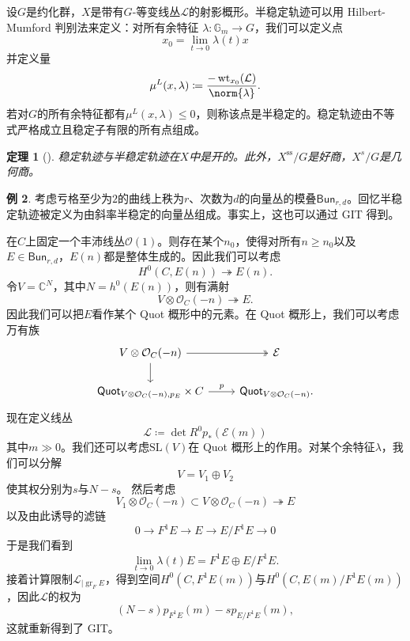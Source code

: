 \documentclass{amsart}
\newtheorem{thm}{定理}[section]
\theoremstyle{definition}
\newtheorem{exm}[thm]{例}
\theoremstyle{remark}
\theoremstyle{plain}
\theoremstyle{definition}
\theoremstyle{remark}
\newcommand{\G}{\mathbb{G}}
\newcommand{\C}{\mathbb{C}}
\newcommand{\mc}[1]{\mathcal{#1}}
\newcommand{\mr}[1]{\mathrm{#1}}
\newcommand{\on}[1]{\operatorname{#1}}
\newcommand{\ms}[1]{\mathsf{#1}}
\newcommand{\1}{\mathbf{1}}
\newcommand{\2}{\mathbf{2}}
\newcommand{\3}{\mathbf{3}}
\begin{document}
设\(G\)是约化群，\(X\)是带有\(G\)-等变线丛\(\mc{L}\)的射影概形。半稳定轨迹可以用 Hilbert-Mumford 判别法来定义：对所有余特征
\(\lambda \colon \G_m \to G\)，我们可以定义点
\[ x_0 = \lim_{t \to 0} \lambda(t) x \]
并定义量
\[ \mu^L(x, \lambda) \coloneqq \frac{-\on{wt}_{x_0}(\mc{L})}{\norm{\lambda}}. \]
若对\(G\)的所有余特征都有\(\mu^L(x, \lambda) \leq 0\)，则称该点是半稳定的。稳定轨迹由不等式严格成立且稳定子有限的所有点组成。

\begin{thm}[{\cite{MFK1994}}]
    稳定轨迹与半稳定轨迹在\(X\)中是开的。此外，\(X^{\on{ss}}/G\)是好商，\(X^s/G\)是几何商。
\end{thm}

\begin{exm}
    考虑亏格至少为\(2\)的曲线上秩为\(r\)、次数为\(d\)的向量丛的模叠\(\ms{Bun}_{r,d}\)。回忆半稳定轨迹被定义为由斜率半稳定的向量丛组成。事实上，这也可以通过 GIT 得到。

    在\(C\)上固定一个丰沛线丛\(\mc{O}(1)\)。则存在某个\(n_0\)，使得对所有\(n \geq n_0\)以及\(E \in \ms{Bun}_{r,d}\)，\(E(n)\)都是整体生成的。因此我们可以考虑
    \[ H^0(C, E(n)) \twoheadrightarrow E(n). \]
    令\(V = \C^N\)，其中\(N = h^0(E(n))\)，则有满射
    \[ V \otimes \mc{O}_C(-n) \twoheadrightarrow E. \]
    因此我们可以把\(E\)看作某个 Quot 概形中的元素。在 Quot 概形上，我们可以考虑万有族
    \begin{equation*}
    \begin{tikzcd}
        V \otimes \mc{O}_C(-n) \ar[twoheadrightarrow]{r} \ar{d} & \mc{E} \\
        \ms{Quot}_{V \otimes \mc{O}_C(-n), p_E} \times C \ar{r}{p} & \ms{Quot}_{V \otimes \mc{O}_C(-n)}.
    \end{tikzcd}
    \end{equation*}
    现在定义线丛
    \[ \mc{L} \coloneqq \det R^0 p_* (\mc{E}(m)) \]
    其中\(m \gg 0\)。我们还可以考虑\(\mr{SL}(V)\)在 Quot 概形上的作用。对某个余特征\(\lambda\)，我们可以分解
    \[ V = V_1 \oplus V_2 \]
    使其权分别为\(s\)与\(N-s\)。
    然后考虑
    \[ V_1 \otimes \mc{O}_C(-n) \subset V \otimes \mc{O}_C(-n) \twoheadrightarrow E \]
    以及由此诱导的滤链
    \[ 0 \to F^1 E \to E \to E / F^1 E \to 0 \]
    于是我们看到
    \[ \lim_{t \to 0} \lambda(t) E = F^1 E \oplus E/F^1 E. \]
    接着计算限制\(\mc{L}_{|\on{gr}_F E}\)，得到空间\(H^0(C, F^1 E(m))\)与\(H^0(C, E(m)/F^1 E(m))\)，因此\(\mc{L}\)的权为
    \[ (N-s) p_{F^1 E}(m) - s p_{E/F^1 E}(m), \]
    这就重新得到了 GIT。
\end{exm}
\end{document}
